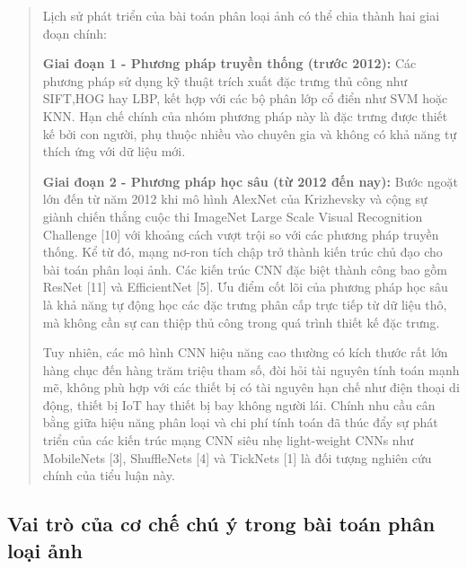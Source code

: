 \documentclass[
  12pt,
  a4paper,
]{report}
\begin{document}
\begin{quote}
Lịch sử phát triển của bài toán phân loại ảnh có thể chia thành hai giai
đoạn chính:

\textbf{Giai đoạn 1 - Phương pháp truyền thống (trước 2012):} Các phương
pháp sử dụng kỹ thuật trích xuất đặc trưng thủ công như SIFT,HOG hay
LBP, kết hợp với các bộ phân lớp cổ điển như SVM hoặc KNN. Hạn chế chính
của nhóm phương pháp này là đặc trưng được thiết kế bởi con người, phụ
thuộc nhiều vào chuyên gia và không có khả năng tự thích ứng với dữ liệu
mới.

\textbf{Giai đoạn 2 - Phương pháp học sâu (từ 2012 đến nay):} Bước ngoặt
lớn đến từ năm 2012 khi mô hình AlexNet của Krizhevsky và cộng sự giành
chiến thắng cuộc thi ImageNet Large Scale Visual Recognition Challenge
{[}10{]} với khoảng cách vượt trội so với các phương pháp truyền thống.
Kể từ đó, mạng nơ-ron tích chập trở thành kiến trúc chủ đạo cho bài toán
phân loại ảnh. Các kiến trúc CNN đặc biệt thành công bao gồm ResNet
{[}11{]} và EfficientNet {[}5{]}. Ưu điểm cốt lõi của phương pháp học
sâu là khả năng tự động học các đặc trưng phân cấp trực tiếp từ dữ liệu
thô, mà không cần sự can thiệp thủ công trong quá trình thiết kế đặc
trưng.

Tuy nhiên, các mô hình CNN hiệu năng cao thường có kích thước rất lớn
hàng chục đến hàng trăm triệu tham số, đòi hỏi tài nguyên tính toán mạnh
mẽ, không phù hợp với các thiết bị có tài nguyên hạn chế như điện thoại
di động, thiết bị IoT hay thiết bị bay không người lái. Chính nhu cầu
cân bằng giữa hiệu năng phân loại và chi phí tính toán đã thúc đẩy sự
phát triển của các kiến trúc mạng CNN siêu nhẹ light-weight CNNs như
MobileNets {[}3{]}, ShuffleNets {[}4{]} và TickNets {[}1{]} là đối tượng
nghiên cứu chính của tiểu luận này.
\end{quote}

\subsection{Vai trò của cơ chế chú ý trong bài toán phân loại
ảnh}\label{vai-truxf2-cux1ee7a-cux1a1-chux1ebf-chuxfa-uxfd-trong-buxe0i-touxe1n-phuxe2n-loux1ea1i-ux1ea3nh}
\end{document}
